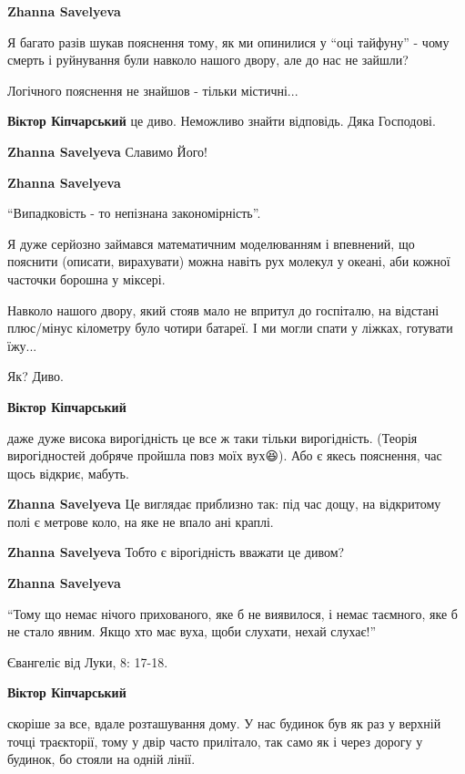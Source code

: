 \begin{itemize} %
\textbf{Zhanna Savelyeva} 

Я багато разів шукав пояснення тому, як ми опинилися у \enquote{оці тайфуну} - чому
смерть і руйнування були навколо нашого двору, але до нас не зайшли?

Логічного пояснення не знайшов - тільки містичні...

\textbf{Віктор Кіпчарський} це диво. Неможливо знайти відповідь. Дяка Господові.

\textbf{Zhanna Savelyeva} Славимо Його!

\textbf{Zhanna Savelyeva} 

\enquote{Випадковість - то непізнана закономірність}.

Я дуже серйозно займався математичним моделюванням і впевнений, що пояснити
(описати, вирахувати) можна навіть рух молекул у океані, аби кожної часточки
борошна у міксері.

Навколо нашого двору, який стояв мало не впритул до госпіталю, на відстані
плюс/мінус кілометру було чотири батареї. І ми могли спати у ліжках, готувати
їжу...

Як? Диво.

\textbf{Віктор Кіпчарський} 

даже дуже висока вирогідність це все ж таки тільки вирогідність. (Теорія
вирогідностей добряче пройшла повз моїх вух😆). Або є якесь пояснення, час щось
відкриє, мабуть.

\textbf{Zhanna Savelyeva} Це виглядає приблизно так: під час дощу, на відкритому полі є метрове коло, на яке не впало ані краплі.

\textbf{Zhanna Savelyeva} Тобто є вірогідність вважати це дивом?

\textbf{Zhanna Savelyeva} 

\enquote{Тому що немає нічого прихованого, яке б не виявилося, і немає таємного, яке б
не стало явним. Якщо хто має вуха, щоби слухати, нехай слухає!}

Євангеліє від Луки, 8: 17-18.

\textbf{Віктор Кіпчарський} 

скоріше за все, вдале розташування дому. У нас будинок був як раз у верхній
точці траєкторії, тому у двір часто прилітало, так само як і через дорогу у
будинок, бо стояли на одній лінії.


\end{itemize}
